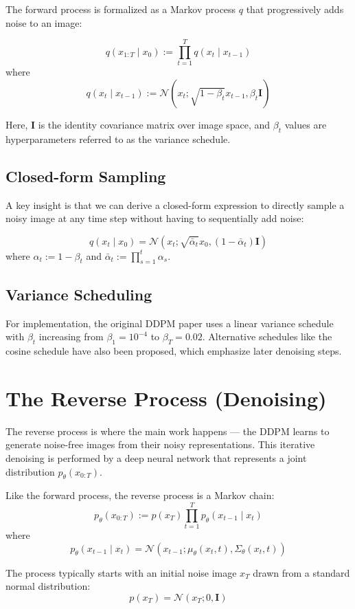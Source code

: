 The forward process is formalized as a Markov process $q$ that progressively adds noise to an image:
\begin{definition}
\[
q(x_{1:T} \mid x_0) := \prod_{t=1}^{T} q(x_t \mid x_{t-1})
\]
where
\[
q(x_t \mid x_{t-1}) := \mathcal{N}(x_t; \sqrt{1 - \beta_t}x_{t-1}, \beta_t \mathbf{I})
\]
\end{definition}

Here, $\mathbf{I}$ is the identity covariance matrix over image space, and $\beta_t$ values are hyperparameters referred to as the variance schedule.

\subsection*{Closed-form Sampling}
A key insight is that we can derive a closed-form expression to directly sample a noisy image at any time step without having to sequentially add noise:
\begin{definition}
\[
q(x_t \mid x_0) = \mathcal{N}(x_t; \sqrt{\bar{\alpha}_t} x_0, (1 - \bar{\alpha}_t)\mathbf{I})
\]
where $\alpha_t := 1 - \beta_t$ and $\bar{\alpha}_t := \prod_{s=1}^{t} \alpha_s$.
\end{definition}

\subsection*{Variance Scheduling}
For implementation, the original DDPM paper uses a linear variance schedule with $\beta_t$ increasing from $\beta_1 = 10^{-4}$ to $\beta_T = 0.02$. Alternative schedules like the cosine schedule have also been proposed, which emphasize later denoising steps.

\section{The Reverse Process (Denoising)}

The reverse process is where the main work happens --- the DDPM learns to generate noise-free images from their noisy representations. This iterative denoising is performed by a deep neural network that represents a joint distribution $p_\theta(x_{0:T})$.

\begin{definition}
Like the forward process, the reverse process is a Markov chain:
\[
p_\theta(x_{0:T}) := p(x_T) \prod_{t=1}^{T} p_\theta(x_{t-1} \mid x_t)
\]
where
\[
p_\theta(x_{t-1} \mid x_t) = \mathcal{N}(x_{t-1}; \mu_\theta(x_t, t), \Sigma_\theta(x_t, t))
\]

The process typically starts with an initial noise image $x_T$ drawn from a standard normal distribution:
\[
p(x_T) = \mathcal{N}(x_T; 0, \mathbf{I})
\]
\end{definition}

